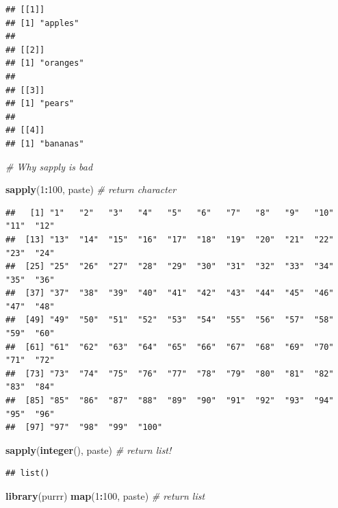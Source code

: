 \documentclass[
]{book}
\newenvironment{Shaded}{\begin{snugshade}}{\end{snugshade}}
\newcommand{\CommentTok}[1]{\textcolor[rgb]{0.56,0.35,0.01}{\textit{#1}}}
\newcommand{\DecValTok}[1]{\textcolor[rgb]{0.00,0.00,0.81}{#1}}
\newcommand{\FunctionTok}[1]{\textcolor[rgb]{0.13,0.29,0.53}{\textbf{#1}}}
\newcommand{\NormalTok}[1]{#1}
\newcommand{\SpecialCharTok}[1]{\textcolor[rgb]{0.81,0.36,0.00}{\textbf{#1}}}
\begin{document}
\begin{verbatim}
## [[1]]
## [1] "apples"
## 
## [[2]]
## [1] "oranges"
## 
## [[3]]
## [1] "pears"
## 
## [[4]]
## [1] "bananas"
\end{verbatim}

\begin{Shaded}
\begin{Highlighting}[]
\CommentTok{\# Why sapply is bad }

\FunctionTok{sapply}\NormalTok{(}\DecValTok{1}\SpecialCharTok{:}\DecValTok{100}\NormalTok{, paste) }\CommentTok{\# return character }
\end{Highlighting}
\end{Shaded}

\begin{verbatim}
##   [1] "1"   "2"   "3"   "4"   "5"   "6"   "7"   "8"   "9"   "10"  "11"  "12" 
##  [13] "13"  "14"  "15"  "16"  "17"  "18"  "19"  "20"  "21"  "22"  "23"  "24" 
##  [25] "25"  "26"  "27"  "28"  "29"  "30"  "31"  "32"  "33"  "34"  "35"  "36" 
##  [37] "37"  "38"  "39"  "40"  "41"  "42"  "43"  "44"  "45"  "46"  "47"  "48" 
##  [49] "49"  "50"  "51"  "52"  "53"  "54"  "55"  "56"  "57"  "58"  "59"  "60" 
##  [61] "61"  "62"  "63"  "64"  "65"  "66"  "67"  "68"  "69"  "70"  "71"  "72" 
##  [73] "73"  "74"  "75"  "76"  "77"  "78"  "79"  "80"  "81"  "82"  "83"  "84" 
##  [85] "85"  "86"  "87"  "88"  "89"  "90"  "91"  "92"  "93"  "94"  "95"  "96" 
##  [97] "97"  "98"  "99"  "100"
\end{verbatim}

\begin{Shaded}
\begin{Highlighting}[]
\FunctionTok{sapply}\NormalTok{(}\FunctionTok{integer}\NormalTok{(), paste) }\CommentTok{\# return list!}
\end{Highlighting}
\end{Shaded}

\begin{verbatim}
## list()
\end{verbatim}

\begin{Shaded}
\begin{Highlighting}[]
\FunctionTok{library}\NormalTok{(purrr)}
\FunctionTok{map}\NormalTok{(}\DecValTok{1}\SpecialCharTok{:}\DecValTok{100}\NormalTok{, paste) }\CommentTok{\# return list}
\end{Highlighting}
\end{Shaded}
\end{document}
